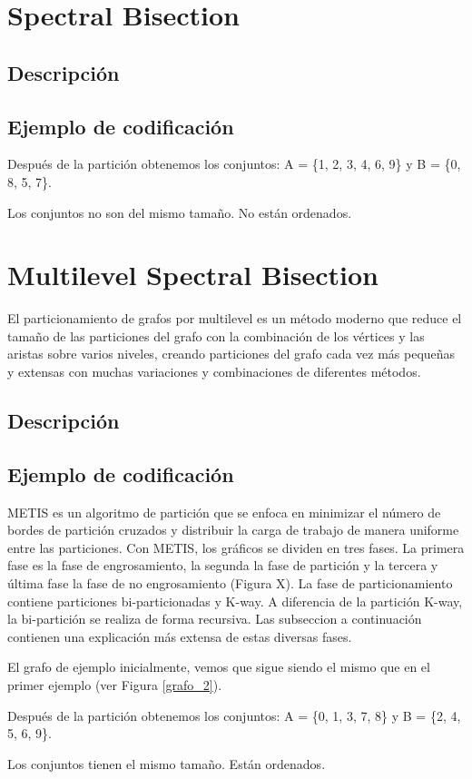 \section{Spectral Bisection}\label{Spectral-Bisection}

\subsection{Descripción}

\subsection{Ejemplo de codificación}

Después de la partición obtenemos los conjuntos: A = \{1, 2, 3, 4, 6, 9\} y B = \{0, 8, 5, 7\}.

Los conjuntos no son del mismo tamaño. No están ordenados.

\section{Multilevel Spectral Bisection}\label{Multilevel-Spectral-Bisection}

El particionamiento de grafos por multilevel es un método moderno que reduce el tamaño de las particiones del grafo con la combinación de los vértices y las aristas sobre varios niveles, creando particiones del grafo cada vez más pequeñas y extensas con muchas variaciones y combinaciones de diferentes métodos.

\subsection{Descripción}

\subsection{Ejemplo de codificación}

METIS es un algoritmo de partición que se enfoca en minimizar el número de bordes de partición cruzados y distribuir la carga de trabajo de manera uniforme entre las particiones. Con METIS, los gráficos se dividen en tres fases. La primera fase es la fase de engrosamiento, la segunda la fase de partición y la tercera y última fase la fase de no engrosamiento (Figura X). La fase de particionamiento contiene particiones bi-particionadas y K-way. A diferencia de la partición K-way, la bi-partición se realiza de forma recursiva. Las subseccion a continuación contienen una explicación más extensa de estas diversas fases.

El grafo de ejemplo inicialmente, vemos que sigue siendo el mismo que en el primer ejemplo (ver Figura \ref{grafo_2}).

Después de la partición obtenemos los conjuntos: A = \{0, 1, 3, 7, 8\} y B = \{2, 4, 5, 6, 9\}.

Los conjuntos tienen el mismo tamaño. Están ordenados.